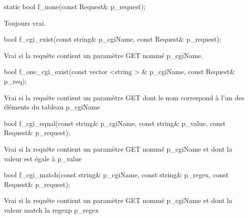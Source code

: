\begin{DoxyItemize}
\item 
\begin{DoxyCode}
\textcolor{keyword}{static} \textcolor{keywordtype}{bool} f\_none(\textcolor{keyword}{const} Request& p\_request); 
\end{DoxyCode}
 Toujours vrai. \par
\par
 \par
\par

\item 
\begin{DoxyCode}
\textcolor{keywordtype}{bool} f\_cgi\_exist(\textcolor{keyword}{const} \textcolor{keywordtype}{string}& p\_cgiName, \textcolor{keyword}{const} Request& p\_request); 
\end{DoxyCode}
 Vrai si la requête contient un paramètre G\-E\-T nommé p\-\_\-cgi\-Name. \par
\par
 \par
\par

\item 
\begin{DoxyCode}
\textcolor{keywordtype}{bool} f\_one\_cgi\_exist(\textcolor{keyword}{const} vector <string > & p\_cgiName, \textcolor{keyword}{const} Request& p\_req); 
\end{DoxyCode}
 \par
\par
 Vrai si la requête contient un paramètre G\-E\-T dont le nom correspond à l'un des éléments du tableau p\-\_\-cgi\-Name \par
\par

\item 
\begin{DoxyCode}
\textcolor{keywordtype}{bool} f\_cgi\_equal(\textcolor{keyword}{const} \textcolor{keywordtype}{string}& p\_cgiName, \textcolor{keyword}{const} \textcolor{keywordtype}{string}& p\_value, \textcolor{keyword}{const} Request& p\_request); 
\end{DoxyCode}
 \par
\par
 Vrai si la requête contient un paramètre G\-E\-T nommé p\-\_\-cgi\-Name et dont la valeur est égale à p\-\_\-value \par
\par

\item 
\begin{DoxyCode}
\textcolor{keywordtype}{bool} f\_cgi\_match(\textcolor{keyword}{const} \textcolor{keywordtype}{string}& p\_cgiName, \textcolor{keyword}{const} \textcolor{keywordtype}{string}& p\_regex, \textcolor{keyword}{const} Request& p\_request); 
\end{DoxyCode}
 \par
\par
 Vrai si la requête contient un paramètre G\-E\-T nommé p\-\_\-cgi\-Name et dont la valeur match la regexp p\-\_\-regex \par
\par


\end{DoxyItemize}
